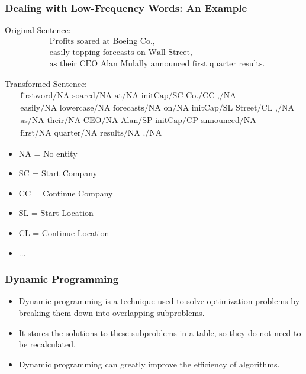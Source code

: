 \documentclass[handout]{beamer}
\begin{document}
\begin{frame}
  \frametitle{Dealing with Low-Frequency Words: An Example}
  \scriptsize
Original Sentence:
\[
\begin{aligned}
&\text{Profits soared at Boeing Co.,} \\
&\text{easily topping forecasts on Wall Street,} \\
&\text{as their CEO Alan Mulally announced first quarter results.}
\end{aligned}
\]

Transformed Sentence:
\[
\begin{aligned}
&\text{firstword/NA soared/NA at/NA initCap/SC Co./CC ,/NA} \\
&\text{easily/NA lowercase/NA forecasts/NA on/NA initCap/SL Street/CL ,/NA} \\
&\text{as/NA their/NA CEO/NA Alan/SP initCap/CP announced/NA} \\
&\text{first/NA quarter/NA results/NA ./NA}
\end{aligned}
\]
  \begin{itemize}
    \item NA = No entity
    \item SC = Start Company
    \item CC = Continue Company
    \item SL = Start Location
    \item CL = Continue Location
    \item ...
  \end{itemize}
\end{frame}






\begin{frame}[fragile]
  \frametitle{Dynamic Programming}

  \begin{itemize}
    \item Dynamic programming is a technique used to solve optimization problems by breaking them down into overlapping subproblems.
    \item It stores the solutions to these subproblems in a table, so they do not need to be recalculated.
    \item Dynamic programming can greatly improve the efficiency of algorithms.
  \end{itemize}

\end{frame}
\end{document}
